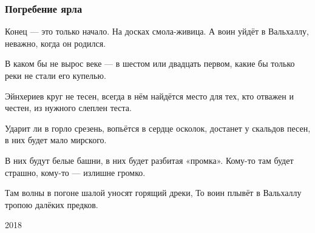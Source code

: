  
 
 

\subsubsection{Погребение ярла}

Конец — это только начало.
На досках смола-живица.
А воин уйдёт в Вальхаллу,
неважно, когда он родился.

В каком бы не вырос веке —
в шестом или двадцать первом,
какие бы только реки
не стали его купелью.

Эйнхериев круг не тесен,
всегда в нём найдётся место
для тех, кто отважен и честен,
из нужного слеплен теста.

Ударит ли в горло срезень,
вопьётся в сердце осколок,
достанет у скальдов песен,
в них будет мало мирского.

В них будут белые башни,
в них будет разбитая «промка».
Кому-то там будет страшно,
кому-то — излишне громко.

Там волны в погоне шалой
уносят горящий дреки,
То воин плывёт в Вальхаллу
тропою далёких предков.

2018
